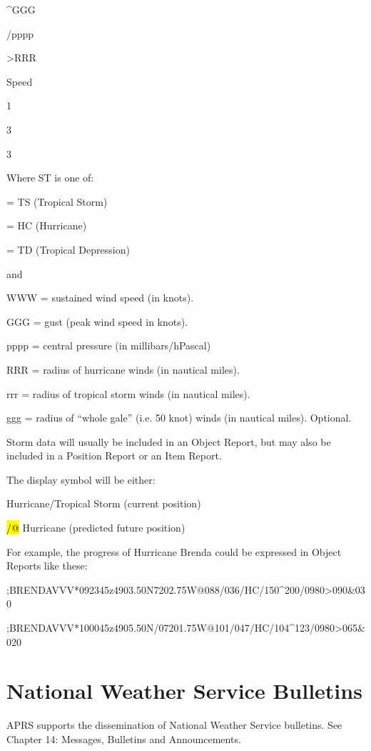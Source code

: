^GGG

/pppp

>RRR

Speed

1

3

3



Where ST is one of:

\begin{description}
\item = TS (Tropical Storm)
\item = HC (Hurricane)
\item = TD (Tropical Depression)
\end{description}

and
\begin{description}
\item WWW = sustained wind speed (in knots).
\item GGG = gust (peak wind speed in knots).
\item pppp = central pressure (in millibars/hPascal)
\item RRR = radius of hurricane winds (in nautical miles).
\item rrr = radius of tropical storm winds (in nautical miles).
\item ggg = radius of “whole gale” (i.e. 50 knot) winds (in nautical
  miles). Optional.
\end {description}


Storm data will usually be included in an Object Report, but may also be
included in a Position Report or an Item Report.


The display symbol will be either:

\begin{description}
\item \hl{\@} Hurricane/Tropical Storm (current position)
\item \hl{/@} Hurricane (predicted future position)
\end{description}

For example, the progress of Hurricane Brenda could be expressed in Object
Reports like these:
\begin{description}
\item ;BRENDAVVV*092345z4903.50N\07202.75W@088/036/HC/150^200/0980>090&030%
\item ;BRENDAVVV*100045z4905.50N/07201.75W@101/047/HC/104^123/0980>065&020%
\end{description}


\section {National Weather Service Bulletins}

APRS supports the dissemination of National Weather Service bulletins. See
Chapter 14: Messages, Bulletins and Announcements.



